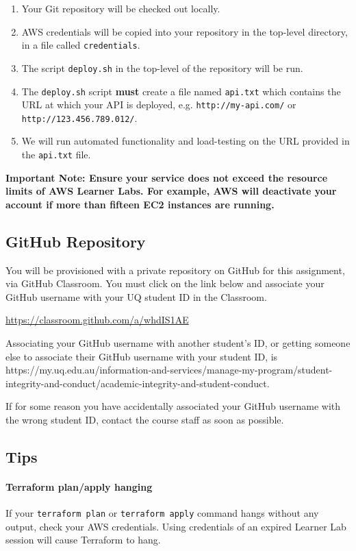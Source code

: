\documentclass{csse4400}
\begin{document}
\begin{enumerate}
  \item Your Git repository will be checked out locally.
  \item AWS credentials will be copied into your repository in the top-level directory,
  in a file called \texttt{credentials}.
  \item The script \texttt{deploy.sh} in the top-level of the repository will be run.
  \item The \texttt{deploy.sh} script \textbf{must} create a file named \texttt{api.txt} which contains the URL at which your API is deployed, e.g. \texttt{http://my-api.com/} or \texttt{http://123.456.789.012/}.
  \item We will run automated functionality and load-testing on the URL provided in the \texttt{api.txt} file.
\end{enumerate}

\noindent
\textbf{Important Note: Ensure your service does not exceed the resource limits of AWS Learner Labs. For example, AWS will deactivate your account if more than fifteen EC2 instances are running.}

\subsection{GitHub Repository}\label{sec:github}
You will be provisioned with a private repository on GitHub for this assignment, via GitHub Classroom. You must click on the link below and associate your GitHub username with your UQ student ID in the Classroom.

\url{https://classroom.github.com/a/whdIS1AE}

\noindent
Associating your GitHub username with another student's ID, or getting someone else to associate their GitHub username with your student ID, is  {https://my.uq.edu.au/information-and-services/manage-my-program/student-integrity-and-conduct/academic-integrity-and-student-conduct}.

If for some reason you have accidentally associated your GitHub username with the wrong student ID, contact the course staff as soon as possible.

\subsection{Tips}

\paragraph{Terraform plan/apply hanging}
If your \texttt{terraform plan} or \texttt{terraform apply} command hangs without any output, check your AWS credentials. Using credentials of an expired Learner Lab session will cause Terraform to hang.
\end{document}
